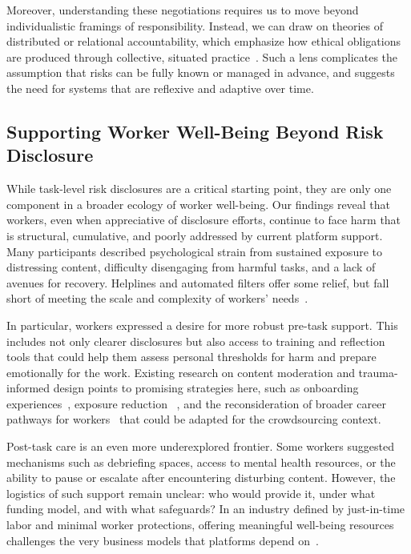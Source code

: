 Moreover, understanding these negotiations requires us to move beyond individualistic framings of responsibility. Instead, we can draw on theories of distributed or relational accountability, which emphasize how ethical obligations are produced through collective, situated practice~\cite{marwick2014networked}. Such a lens complicates the assumption that risks can be fully known or managed in advance, and suggests the need for systems that are reflexive and adaptive over time.


\subsection{Supporting Worker Well-Being Beyond Risk Disclosure}
While task-level risk disclosures are a critical starting point, they are only one component in a broader ecology of worker well-being. Our findings reveal that workers, even when appreciative of disclosure efforts, continue to face harm that is structural, cumulative, and poorly addressed by current platform support. Many participants described psychological strain from sustained exposure to distressing content, difficulty disengaging from harmful tasks, and a lack of avenues for recovery. Helplines and automated filters offer some relief, but fall short of meeting the scale and complexity of workers’ needs~\cite{qian2025aura, spence2023content, steiger2022effects}.

In particular, workers expressed a desire for more robust pre-task support. This includes not only clearer disclosures but also access to training and reflection tools that could help them assess personal thresholds for harm and prepare emotionally for the work. Existing research on content moderation and trauma-informed design points to promising strategies here, such as onboarding experiences~\cite{steiger_psychological_2021, steiger2022effects}, exposure reduction ~\cite{dang_but_2018, das_fast_2020, Iyadurai2018PreventingIntrusiveMemories, holmes_can_2009}, and the reconsideration of broader career pathways for workers~\cite{qian2025aura} that could be adapted for the crowdsourcing context.

Post-task care is an even more underexplored frontier. Some workers suggested mechanisms such as debriefing spaces, access to mental health resources, or the ability to pause or escalate after encountering disturbing content. However, the logistics of such support remain unclear: who would provide it, under what funding model, and with what safeguards? In an industry defined by just-in-time labor and minimal worker protections, offering meaningful well-being resources challenges the very business models that platforms depend on~\cite{gray2019ghost}.

